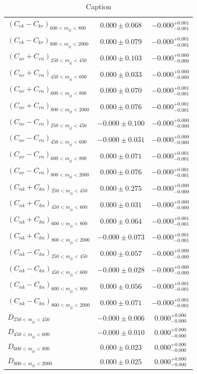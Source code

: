 \begin{table}[htb]
\begin{tabular}{l | c c}
$(C_{rk}-C_{kr})_{600 < m_{t\bar{t}} < 800}$ & $0.000 \pm 0.068$ & $-0.000^{+0.001}_{-0.001}$  \\
$(C_{rk}-C_{kr})_{800 < m_{t\bar{t}} < 2000}$ & $0.000 \pm 0.079$ & $-0.000^{+0.001}_{-0.001}$  \\
$(C_{nr}+C_{rn})_{250 < m_{t\bar{t}} < 450}$ & $0.000 \pm 0.103$ & $-0.000^{+0.000}_{-0.000}$  \\
$(C_{nr}+C_{rn})_{450 < m_{t\bar{t}} < 600}$ & $0.000 \pm 0.033$ & $-0.000^{+0.000}_{-0.000}$  \\
$(C_{nr}+C_{rn})_{600 < m_{t\bar{t}} < 800}$ & $0.000 \pm 0.070$ & $-0.000^{+0.001}_{-0.001}$  \\
$(C_{nr}+C_{rn})_{800 < m_{t\bar{t}} < 2000}$ & $0.000 \pm 0.076$ & $-0.000^{+0.001}_{-0.001}$  \\
$(C_{nr}-C_{rn})_{250 < m_{t\bar{t}} < 450}$ & $-0.000 \pm 0.100$ & $-0.000^{+0.000}_{-0.000}$  \\
$(C_{nr}-C_{rn})_{450 < m_{t\bar{t}} < 600}$ & $-0.000 \pm 0.031$ & $-0.000^{+0.000}_{-0.000}$  \\
$(C_{nr}-C_{rn})_{600 < m_{t\bar{t}} < 800}$ & $0.000 \pm 0.071$ & $-0.000^{+0.001}_{-0.001}$  \\
$(C_{nr}-C_{rn})_{800 < m_{t\bar{t}} < 2000}$ & $0.000 \pm 0.076$ & $-0.000^{+0.001}_{-0.001}$  \\
$(C_{nk}+C_{kn})_{250 < m_{t\bar{t}} < 450}$ & $0.000 \pm 0.275$ & $-0.000^{+0.000}_{-0.000}$  \\
$(C_{nk}+C_{kn})_{450 < m_{t\bar{t}} < 600}$ & $0.000 \pm 0.031$ & $-0.000^{+0.000}_{-0.000}$  \\
$(C_{nk}+C_{kn})_{600 < m_{t\bar{t}} < 800}$ & $0.000 \pm 0.064$ & $-0.000^{+0.001}_{-0.001}$  \\
$(C_{nk}+C_{kn})_{800 < m_{t\bar{t}} < 2000}$ & $-0.000 \pm 0.073$ & $-0.000^{+0.001}_{-0.001}$  \\
$(C_{nk}-C_{kn})_{250 < m_{t\bar{t}} < 450}$ & $0.000 \pm 0.057$ & $-0.000^{+0.000}_{-0.000}$  \\
$(C_{nk}-C_{kn})_{450 < m_{t\bar{t}} < 600}$ & $-0.000 \pm 0.028$ & $-0.000^{+0.000}_{-0.000}$  \\
$(C_{nk}-C_{kn})_{600 < m_{t\bar{t}} < 800}$ & $0.000 \pm 0.056$ & $-0.000^{+0.001}_{-0.001}$  \\
$(C_{nk}-C_{kn})_{800 < m_{t\bar{t}} < 2000}$ & $0.000 \pm 0.071$ & $-0.000^{+0.001}_{-0.001}$  \\
$D_{250 < m_{t\bar{t}} < 450}$ & $-0.000 \pm 0.006$ & $0.000^{+0.000}_{-0.000}$  \\
$D_{450 < m_{t\bar{t}} < 600}$ & $-0.000 \pm 0.010$ & $0.000^{+0.000}_{-0.000}$  \\
$D_{600 < m_{t\bar{t}} < 800}$ & $0.000 \pm 0.023$ & $0.000^{+0.000}_{-0.000}$  \\
$D_{800 < m_{t\bar{t}} < 2000}$ & $0.000 \pm 0.025$ & $0.000^{+0.000}_{-0.000}$  \\
\hline
\end{tabular}
    \caption{Caption}
    \label{tab:Extracted_Coefficients_2D_Spin_Correlations}
\end{table}

\clearpage